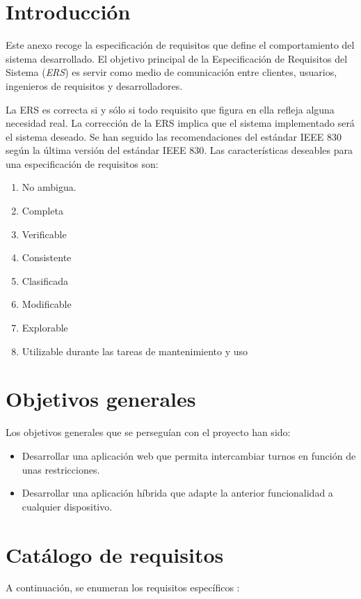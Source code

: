 
\section{Introducción}\label{introduccion-requisitos}

Este anexo recoge la especificación de requisitos que define el comportamiento del sistema desarrollado. El objetivo principal de la Especificación de Requisitos del Sistema (\emph{ERS}) es servir como medio de comunicación entre clientes, usuarios, ingenieros de requisitos y desarrolladores.

La ERS es correcta si y sólo si todo requisito que figura en ella refleja alguna necesidad
real. La corrección de la ERS implica que el sistema implementado será el sistema
deseado. Se han seguido las recomendaciones del estándar IEEE 830 según la última versión del estándar IEEE 830. Las características deseables para una especificación de requisitos son:


\begin{enumerate}
	\item No ambigua.
	\item Completa
	\item  Verificable
	\item  Consistente
	\item  Clasificada
	\item  Modificable
	\item  Explorable
	\item  Utilizable durante las tareas de mantenimiento y uso
\end{enumerate}


\section{Objetivos generales}\label{objetivos-generales}
Los objetivos generales que se perseguían con el proyecto han sido:
\begin{itemize}
	\item Desarrollar una aplicación web que permita intercambiar turnos en función de unas restricciones.
	\item Desarrollar una aplicación híbrida que adapte la anterior funcionalidad a cualquier dispositivo.
\end{itemize}


\section{Catálogo de requisitos}\label{catalogo-requisitos}
A continuación, se enumeran los requisitos específicos :

